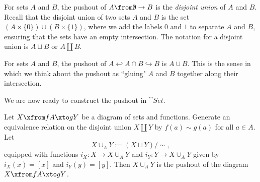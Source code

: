 \documentclass[noname]{notes}
\begin{document}
\begin{example}
	For sets $A$ and $B$, the pushout of $A \from \emptyset \to B$ is the \emph{disjoint union} of $A$ and $B$. Recall that the disjoint union of two sets $A$ and $B$ is the set $(A \times \{0\}) \cup (B \times \{1\})$, where we add the labels $0$ and $1$ to separate $A$ and $B$, ensuring that the sets have an empty intersection. The notation for a disjoint union is $A \sqcup B$ or $A \amalg B$. 
\end{example}

\begin{example}
	For sets $A$ and $B$, the pushout of $A \hookleftarrow A \cap B \hookrightarrow B$ is $A \cup B$. This is the sense in which we think about the pushout as ``gluing" $A$ and $B$ together along their intersection. 
\end{example}

We are now ready to construct the pushout in $\cat{Set}$. 

\begin{proposition}
	Let $X \xfrom f A \xto g Y$ be a diagram of sets and functions. Generate an equivalence relation on the disjoint union $X \amalg Y$ by $f(a) \sim g(a)$ for all $a \in A$. Let  
	\[
		X \cup_A Y := (X \sqcup Y) /\!\!\sim, 
	\]
	equipped with functions $i_X \colon X \to X \cup_A Y$ and $i_Y \colon Y \to X \cup_A Y$ given by $i_X(x) = [x]$ and $i_Y(y) = [y]$. Then $X \cup_A Y$ is the pushout of the diagram $X \xfrom f A \xto g Y$. 
\end{proposition}
\end{document}

